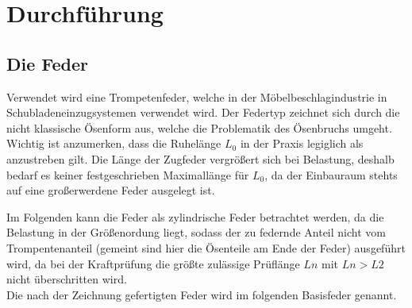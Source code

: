 \newpage
\section{Durchführung}
\label{sec:Durchfuehrung}

\subsection{Die Feder}
\label{sec:feder}
Verwendet wird eine Trompetenfeder, welche in der Möbelbeschlagindustrie in Schubladeneinzugsystemen
verwendet wird. 
Der Federtyp zeichnet sich durch die nicht klassische Ösenform aus, welche die Problematik des Ösenbruchs umgeht.\\

Wichtig ist anzumerken, dass die Ruhelänge $L_0$ in der Praxis legiglich als anzustreben gilt.
Die Länge der Zugfeder vergrößert sich bei Belastung, deshalb bedarf es keiner festgeschrieben Maximallänge für $L_0$, da
der Einbauraum stehts auf eine großerwerdene Feder ausgelegt ist.  

\begin{center}
\end{center}
Im Folgenden kann die Feder als zylindrische Feder betrachtet werden,
da die Belastung in der Größenordung liegt, sodass der zu federnde Anteil nicht 
vom Trompentenanteil (gemeint sind hier die Ösenteile am Ende der Feder)
ausgeführt wird, da bei der Kraftprüfung die größte zulässige Prüflänge $Ln$ mit 
$Ln>L2$ nicht überschritten wird.\\
Die nach der Zeichnung gefertigten Feder wird im folgenden Basisfeder genannt.

